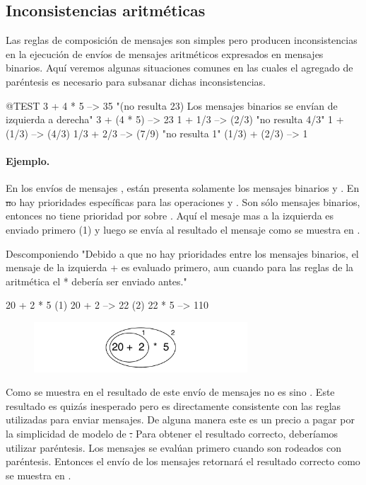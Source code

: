 \documentclass[a4paper,10pt,twoside]{book}
\begin{document}
\subsection{Inconsistencias aritméticas}
Las reglas de composición de mensajes son simples pero producen inconsistencias en la ejecución de envíos de mensajes aritméticos expresados en mensajes binarios. Aquí veremos algunas situaciones comunes en las cuales el agregado de paréntesis es necesario para subsanar dichas inconsistencias.

\begin{code}{@TEST}
3 + 4 * 5      --> 35    "(no resulta 23)  Los mensajes binarios se env\'ian de izquierda a derecha"
3 + (4 * 5)    --> 23
1 + 1/3         --> (2/3)    "no resulta 4/3"
1 + (1/3)       --> (4/3)
1/3 + 2/3       --> (7/9)    "no resulta 1"
(1/3) + (2/3)  --> 1
\end{code}

\paragraph{Ejemplo.}
En los envíos de mensajes , están presenta solamente los mensajes binarios \ct{+} y \ct{*}. En \st no hay prioridades específicas para las operaciones \ct{+} y \ct{*}. Son sólo mensajes binarios, entonces \ct{*} no tiene prioridad por sobre \ct{+}. Aquí el mesaje mas a la izquierda \ct{+} es enviado primero (1) y luego se envía al resultado el mensaje \ct{*} como se muestra en .

\begin{example}[binaryMessages1]{Descomponiendo }{}
"Debido a que no hay prioridades entre los mensajes binarios, el mensaje de la izquierda + es evaluado primero, aun cuando para las reglas de la aritm\'etica el * deber\'ia ser enviado antes."

      20 + 2 * 5
(1)  20 + 2 --> 22
(2)  22       * 5 --> 110
\end{example}

\begin{figure}
\begin{center}\includegraphics[width=8cm]{ucompoNoBracketPar}\end{center}
\end{figure}
\noindent
Como se muestra en  el resultado de este envío de mensajes no es  sino . Este resultado es quizás inesperado pero es directamente consistente con las reglas utilizadas para enviar mensajes. De alguna manera este es un precio a pagar por la simplicidad de modelo de \st. Para obtener el resultado correcto, deberíamos utilizar paréntesis. Los mensajes se evalúan primero cuando son rodeados con paréntesis. Entonces el envío de los mensajes  retornará el resultado correcto como se muestra en .
\end{document}
